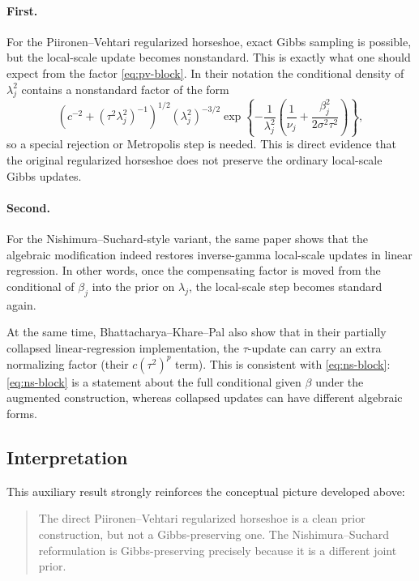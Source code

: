\documentclass[11pt]{article}
\begin{document}
\paragraph{First.}
For the Piironen--Vehtari regularized horseshoe, exact Gibbs sampling is possible, but the local-scale update becomes nonstandard. This is exactly what one should expect from the factor \eqref{eq:pv-block}. In their notation the conditional density of $\lambda_j^2$ contains a nonstandard factor of the form
\[
\left(c^{-2} + (\tau^2\lambda_j^2)^{-1}\right)^{1/2}(\lambda_j^2)^{-3/2}\exp\!\left\{-\frac{1}{\lambda_j^2}\left(\frac{1}{\nu_j}+\frac{\beta_j^2}{2\sigma^2\tau^2}\right)\right\},
\]
so a special rejection or Metropolis step is needed. This is direct evidence that the original regularized horseshoe does not preserve the ordinary local-scale Gibbs updates.

\paragraph{Second.}
For the Nishimura--Suchard-style variant, the same paper shows that the algebraic modification indeed restores inverse-gamma local-scale updates in linear regression. In other words, once the compensating factor is moved from the conditional of $\beta_j$ into the prior on $\lambda_j$, the local-scale step becomes standard again.

At the same time, Bhattacharya--Khare--Pal also show that in their partially collapsed linear-regression implementation, the $\tau$-update can carry an extra normalizing factor (their $c(\tau^2)^p$ term). This is consistent with \eqref{eq:ns-block}: \eqref{eq:ns-block} is a statement about the full conditional given $\beta$ under the augmented construction, whereas collapsed updates can have different algebraic forms.

\subsection{Interpretation}

This auxiliary result strongly reinforces the conceptual picture developed above:

\begin{quote}
The direct Piironen--Vehtari regularized horseshoe is a clean prior construction, but not a Gibbs-preserving one. The Nishimura--Suchard reformulation is Gibbs-preserving precisely because it is a different joint prior.
\end{quote}
\end{document}
